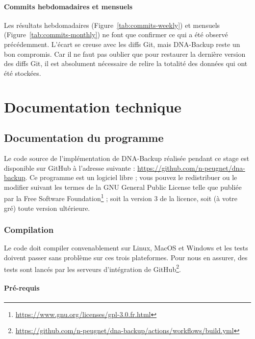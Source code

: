 \documentclass[a4paper]{report}
\begin{document}
\subsubsection{Commits hebdomadaires et mensuels}

Les résultats hebdomadaires (Figure~\ref{tab:commits-weekly}) et mensuels (Figure~\ref{tab:commits-monthly})
ne font que confirmer ce qui a été observé précédemment.
L'écart se creuse avec les diffs Git, mais DNA-Backup reste un bon compromis.
Car il ne faut pas oublier que pour restaurer la dernière version des diffs Git,
il est absolument nécessaire de relire la totalité des données qui ont été stockées.




\appendix



\chapter{Documentation technique}

\section{Documentation du programme}
\label{sec:documentation}

Le code source de l'implémentation de DNA-Backup réalisée pendant ce stage
est disponible sur GitHub à l'adresse suivante :
\url{https://github.com/n-peugnet/dna-backup}.
Ce programme est un logiciel libre ;
vous pouvez le redistribuer ou le modifier suivant les termes de la GNU General Public License
telle que publiée par la Free Software Foundation\footnote{\url{https://www.gnu.org/licenses/gpl-3.0.fr.html}} ;
soit la version 3 de la licence, soit (à votre gré) toute version ultérieure.

\subsection{Compilation}

Le code doit compiler convenablement sur Linux, MacOS et Windows
et les tests doivent passer sans problème sur ces trois plateformes.
Pour nous en assurer, des tests sont lancés par les serveurs
d'intégration de GitHub\footnote{\url{https://github.com/n-peugnet/dna-backup/actions/workflows/build.yml}}.

\subsubsection{Pré-requis}
\end{document}

